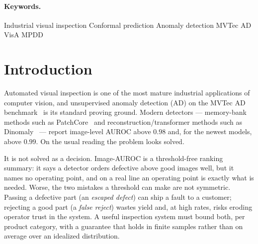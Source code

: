 \documentclass[11pt]{article}
\begin{document}
\paragraph{Keywords.} Industrial visual inspection \textperiodcentered{} Conformal prediction
\textperiodcentered{} Anomaly detection \textperiodcentered{} MVTec AD \textperiodcentered{} VisA
\textperiodcentered{} MPDD

\section{Introduction}
\label{sec:intro}

Automated visual inspection is one of the most mature industrial applications of computer vision,
and unsupervised anomaly detection (AD) on the MVTec AD benchmark~\citep{bergmann2019mvtec} is its
standard proving ground. Modern detectors --- memory-bank methods such as
PatchCore~\citep{roth2022patchcore} and reconstruction/transformer methods such as
Dinomaly~\citep{guo2025dinomaly} --- report image-level AUROC above $0.98$ and, for the newest
models, above $0.99$. On the usual reading the problem looks solved.

It is not solved as a decision. Image-AUROC is a threshold-free ranking summary: it says a
detector orders defective above good images well, but it names no operating point, and on a real
line an operating point is exactly what is needed. Worse, the two mistakes a threshold can make
are not symmetric. Passing a defective part (an \emph{escaped defect}) can ship a fault to a
customer; rejecting a good part (a \emph{false reject}) wastes yield and, at high rates, risks
eroding operator trust in the system. A useful inspection system must bound both, per
product category, with a guarantee that holds in finite samples rather than on average over an
idealized distribution.
\end{document}
